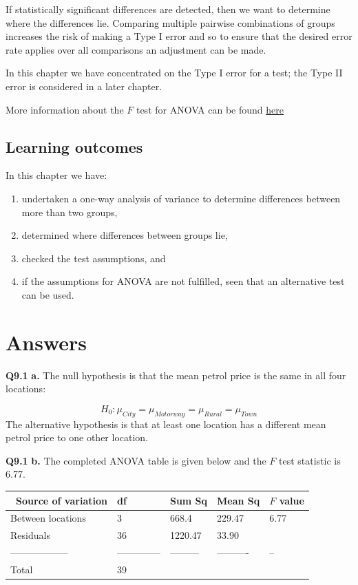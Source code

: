 \documentclass[
  oneside]{krantz}
\begin{document}
If statistically significant differences are detected, then we want to determine where the differences lie. Comparing multiple pairwise combinations of groups increases the risk of making a Type I error and so to ensure that the desired error rate applies over all comparisons an adjustment can be made.

In this chapter we have concentrated on the Type I error for a test; the Type II error is considered in a later chapter.

More information about the \(F\) test for ANOVA can be found \href{https://www.khanacademy.org/math/probability/statistics-inferential/anova/v/anova-3-hypothesis-test-with-f-statistic}{here}

\hypertarget{learning-outcomes-6}{%
\subsection{Learning outcomes}\label{learning-outcomes-6}}

In this chapter we have:

\begin{enumerate}
\def\labelenumi{\arabic{enumi}.}
\item
  undertaken a one-way analysis of variance to determine differences between more than two groups,
\item
  determined where differences between groups lie,
\item
  checked the test assumptions, and
\item
  if the assumptions for ANOVA are not fulfilled, seen that an alternative test can be used.
\end{enumerate}

\hypertarget{ANSanova}{%
\section{Answers}\label{ANSanova}}

\textbf{Q9.1} \textbf{a.} The null hypothesis is that the mean petrol price is the same in all four locations:

\[H_0: \mu_{City} = \mu_{Motorway} = \mu_{Rural} = \mu_{Town} \]
The alternative hypothesis is that at least one location has a different mean petrol price to one other location.

\textbf{Q9.1} \textbf{b.} The completed ANOVA table is given below and the \(F\) test statistic is 6.77.

\begin{longtable}[]{@{}lllll@{}}
\toprule
~Source of variation & df & Sum Sq & Mean Sq & \(F\) value\tabularnewline
\midrule
\endhead
Between locations & 3 & 668.4 & 229.47 & 6.77\tabularnewline
Residuals & 36 & 1220.47 & 33.90 &\tabularnewline
------------------ & -------------- & --------- & ---------- & --\tabularnewline
Total & 39 & & &\tabularnewline
\bottomrule
\end{longtable}
\end{document}
